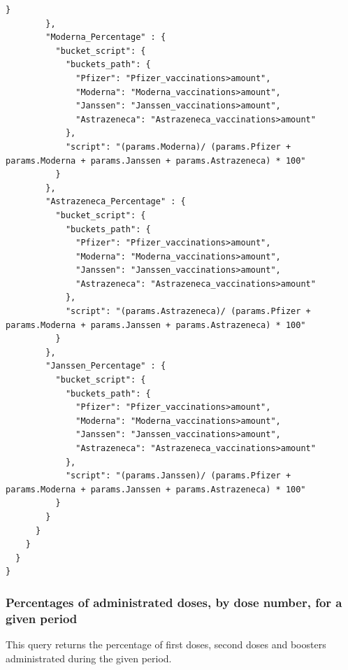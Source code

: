 \documentclass{article}
\begin{document}
\begin{lstlisting}[language=cypher, label=lst:cypher-example]
          }
        },
        "Moderna_Percentage" : {
          "bucket_script": {
            "buckets_path": {
              "Pfizer": "Pfizer_vaccinations>amount",
              "Moderna": "Moderna_vaccinations>amount",
              "Janssen": "Janssen_vaccinations>amount",
              "Astrazeneca": "Astrazeneca_vaccinations>amount"
            },
            "script": "(params.Moderna)/ (params.Pfizer + params.Moderna + params.Janssen + params.Astrazeneca) * 100"
          }
        },
        "Astrazeneca_Percentage" : {
          "bucket_script": {
            "buckets_path": {
              "Pfizer": "Pfizer_vaccinations>amount",
              "Moderna": "Moderna_vaccinations>amount",
              "Janssen": "Janssen_vaccinations>amount",
              "Astrazeneca": "Astrazeneca_vaccinations>amount"
            },
            "script": "(params.Astrazeneca)/ (params.Pfizer + params.Moderna + params.Janssen + params.Astrazeneca) * 100"
          }
        },
        "Janssen_Percentage" : {
          "bucket_script": {
            "buckets_path": {
              "Pfizer": "Pfizer_vaccinations>amount",
              "Moderna": "Moderna_vaccinations>amount",
              "Janssen": "Janssen_vaccinations>amount",
              "Astrazeneca": "Astrazeneca_vaccinations>amount"
            },
            "script": "(params.Janssen)/ (params.Pfizer + params.Moderna + params.Janssen + params.Astrazeneca) * 100"
          }
        }
      }
    }
  }
}

\end{lstlisting}
\subsubsection{Percentages of administrated doses,  by dose number, for a given period}
This query returns the percentage of first doses, second doses and boosters administrated during the given period.
\end{document}
